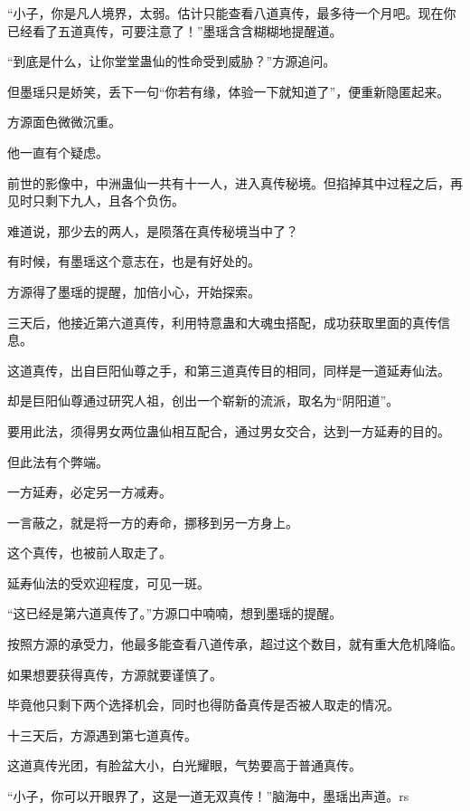 \begin{this_body}
“小子，你是凡人境界，太弱。估计只能查看八道真传，最多待一个月吧。现在你已经看了五道真传，可要注意了！”墨瑶含含糊糊地提醒道。

“到底是什么，让你堂堂蛊仙的性命受到威胁？”方源追问。

但墨瑶只是娇笑，丢下一句“你若有缘，体验一下就知道了”，便重新隐匿起来。

方源面色微微沉重。

他一直有个疑虑。

前世的影像中，中洲蛊仙一共有十一人，进入真传秘境。但掐掉其中过程之后，再见时只剩下九人，且各个负伤。

难道说，那少去的两人，是陨落在真传秘境当中了？

有时候，有墨瑶这个意志在，也是有好处的。

方源得了墨瑶的提醒，加倍小心，开始探索。

三天后，他接近第六道真传，利用特意蛊和大魂虫搭配，成功获取里面的真传信息。

这道真传，出自巨阳仙尊之手，和第三道真传目的相同，同样是一道延寿仙法。

却是巨阳仙尊通过研究人祖，创出一个崭新的流派，取名为“阴阳道”。

要用此法，须得男女两位蛊仙相互配合，通过男女交合，达到一方延寿的目的。

但此法有个弊端。

一方延寿，必定另一方减寿。

一言蔽之，就是将一方的寿命，挪移到另一方身上。

这个真传，也被前人取走了。

延寿仙法的受欢迎程度，可见一斑。

“这已经是第六道真传了。”方源口中喃喃，想到墨瑶的提醒。

按照方源的承受力，他最多能查看八道传承，超过这个数目，就有重大危机降临。

如果想要获得真传，方源就要谨慎了。

毕竟他只剩下两个选择机会，同时也得防备真传是否被人取走的情况。

十三天后，方源遇到第七道真传。

这道真传光团，有脸盆大小，白光耀眼，气势要高于普通真传。

“小子，你可以开眼界了，这是一道无双真传！”脑海中，墨瑶出声道。rs

\end{this_body}

